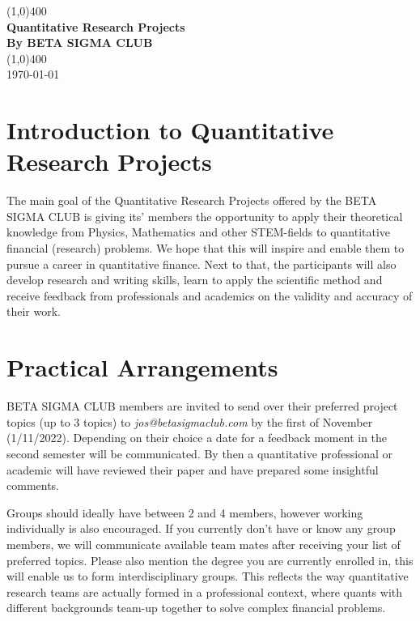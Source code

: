 \documentclass[11pt]{article}
\begin{document}
\begin{titlepage}
\begin{center}
\vspace*{1cm}
\vfill
\line(1,0){400}\\[1mm]
\huge{\textbf{Quantitative Research Projects}}\\[3mm]
\Large{\textbf{By BETA SIGMA CLUB}}\\[1mm]
\line(1,0){400}\\[3mm]
\vfill
\today

\end{center}
\end{titlepage}

\section{Introduction to Quantitative Research Projects}
The main goal of the Quantitative Research Projects offered by the BETA SIGMA CLUB is giving its' members the opportunity to apply their theoretical knowledge from Physics, Mathematics and other STEM-fields to quantitative financial (research) problems. We hope that this will inspire and enable them to pursue a career in quantitative finance. Next to that, the participants will also develop research and writing skills, learn to apply the scientific method and receive feedback from professionals and academics on the validity and accuracy of their work. 


\section{Practical Arrangements}
BETA SIGMA CLUB members are invited to send over their preferred project topics (up to 3 topics) to \textit{jos@betasigmaclub.com} by the first of November (1/11/2022). Depending on their choice a date for a feedback moment in the second semester will be communicated. By then a quantitative professional or academic will have reviewed their paper and have prepared some insightful comments. 

Groups should ideally have between 2 and 4 members, however working individually is also encouraged. If you currently don't have or know any group members, we will communicate available team mates after receiving your list of preferred topics. Please also mention the degree you are currently enrolled in, this will enable us to form interdisciplinary groups. This reflects the way quantitative research teams are actually formed in a professional context, where quants with different backgrounds team-up together to solve complex financial problems. 
\end{document}

